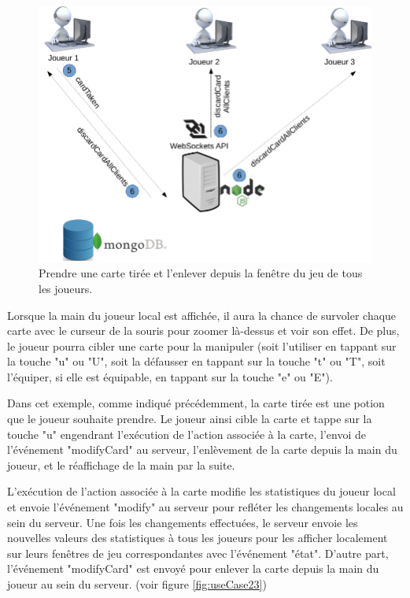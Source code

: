 \documentclass[12pt]{report}
\begin{document}
			\begin{figure}[h!]
		  	\centering
		    \includegraphics[scale=0.5]{images/useCase22.png}
		    \caption{Prendre une carte tirée et l'enlever depuis la fenêtre du jeu de tous les joueurs.}
				\label{fig:useCase22}
		  \end{figure}

			Lorsque la main du joueur local est affichée, il aura la chance de survoler chaque carte avec le curseur de la souris pour zoomer là-dessus et voir son effet. De plus, le joueur pourra cibler une carte pour la manipuler (soit l'utiliser en tappant sur la touche "u" ou "U", soit la défausser en tappant sur la touche "t" ou "T", soit l'équiper, si elle est équipable, en tappant sur la touche "e" ou "E").

			Dans cet exemple, comme indiqué précédemment, la carte tirée est une potion que le joueur souhaite prendre. Le joueur ainsi cible la carte et tappe sur la touche "u" engendrant l'exécution de l'action associée à la carte, l'envoi de l'événement "modifyCard" au serveur, l'enlèvement de la carte depuis la main du joueur, et le réaffichage de la main par la suite.

			L'exécution de l'action associée à la carte modifie les statistiques du joueur local et envoie l'événement "modify" au serveur pour refléter les changements locales au sein du serveur. Une fois les changements effectuées, le serveur envoie les nouvelles valeurs des statistiques à tous les joueurs pour les afficher localement sur leurs fenêtres de jeu correspondantes avec l'événement "état". D'autre part, l'événement "modifyCard" est envoyé pour enlever la carte depuis la main du joueur au sein du serveur. (voir figure \ref{fig:useCase23})
\end{document}
